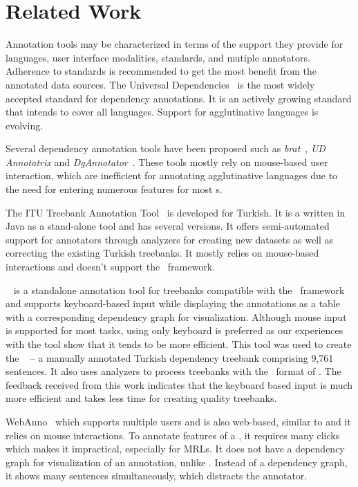 \section{Related Work}
\label{sec:related}

Annotation tools may be characterized in terms of the support they provide for languages, user interface modalities, standards, and mutiple annotators. 
Adherence to standards is recommended to get the most benefit from the annotated data sources. 
The Universal Dependencies~\cite{UD} is the most widely accepted standard for dependency annotations. 
It is an actively growing standard that intends to cover  all languages. 
Support for agglutinative languages is evolving.

Several dependency annotation tools have been proposed such as \textit{brat}~\cite{brat}, \textit{UD Annotatrix} and \textit{DgAnnotator}~\cite{UD-tools}.
These tools mostly rely on mouse-based user interaction, which are inefficient for annotating agglutinative languages due to the need for entering numerous features for  most \form s.

The ITU Treebank Annotation Tool~\cite{pamay-etal-2015-annotation} is developed for Turkish. 
It is a written in Java as a stand-alone tool and has several versions.
It offers semi-automated support for annotators through analyzers for creating new datasets as well as correcting the existing Turkish treebanks.
It mostly relies on mouse-based interactions and doesn't support the \ud\ framework. 



\boatvone~\cite{turk-etal-2019-turkish} is a standalone annotation tool for treebanks compatible with the \ud\ framework~\cite{UD} and supports keyboard-based input while displaying the annotations as a table with a corresponding dependency graph for visualization.
Although mouse input is supported for most tasks, using only keyboard is preferred as our experiences with the tool show that it tends to be more efficient.
This tool was used to create the \bountreebank~\cite{turk2021resources,UD-Boun-Treebank} -- a manually annotated Turkish dependency treebank comprising 9,761 sentences.
It also uses analyzers to process treebanks with the \conllu\ format of \ud. 
The feedback received from this work indicates that the keyboard based input is much more efficient and takes less time for creating quality treebanks.

WebAnno~\cite{webanno} which supports multiple users and is also web-based, similar to \boatvtwo and it relies on mouse interactions.
To annotate features of a \form, it requires many clicks which makes it impractical, especially for MRLs.
It does not have a dependency graph for visualization of an annotation, unlike \boatvone. Instead of a dependency graph, it shows many sentences simultaneously, which distracts the annotator.

